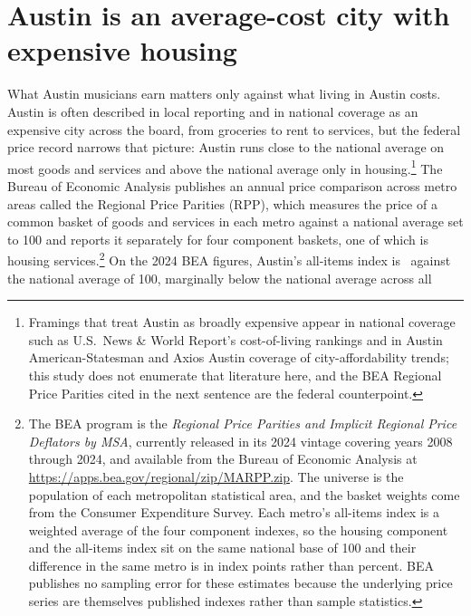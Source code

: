 \section{Austin is an average-cost city with expensive housing}
\label{sec:costs}

What Austin musicians earn matters only against what living in Austin costs.
Austin is often described in local reporting and in national coverage as an
expensive city across the board, from groceries to rent to services, but the
federal price record narrows that picture: Austin runs close to the national
average on most goods and services and above the national average only in
housing.\footnote{Framings that treat Austin as broadly expensive appear in
national coverage such as U.S.\ News \& World Report's cost-of-living
rankings and in Austin American-Statesman and Axios Austin coverage of
city-affordability trends; this study does not enumerate that literature
here, and the BEA Regional Price Parities cited in the next sentence are
the federal counterpoint.} The Bureau of
Economic Analysis publishes an annual price comparison across metro areas
called the Regional Price Parities (RPP), which measures the price of a common
basket of goods and services in each metro against a national average set to
100 and reports it separately for four component baskets, one of which is
housing services.\footnote{The BEA program is the \textit{Regional Price
Parities and Implicit Regional Price Deflators by MSA}, currently released in
its 2024 vintage covering years 2008 through 2024, and available from the
Bureau of Economic Analysis at
\url{https://apps.bea.gov/regional/zip/MARPP.zip}. The universe is the
population of each metropolitan statistical area, and the basket weights come
from the Consumer Expenditure Survey. Each metro's all-items index is a
weighted average of the four component indexes, so the housing component and
the all-items index sit on the same national base of 100 and their difference
in the same metro is in index points rather than percent. BEA publishes no
sampling error for these estimates because the underlying price series are
themselves published indexes rather than sample statistics.} On the 2024 BEA
figures, Austin's all-items index is \NColRppAllitemsAustin\ against the
national average of 100, marginally below the national average across all
